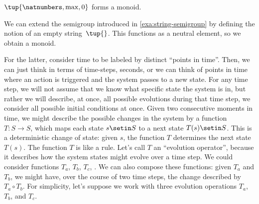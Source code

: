 \begin{example}
    $\tup{\natnumbers, \max,0}$ forms a monoid.
\end{example}

\begin{example}
    \label{exa:string-monoid}
    We can extend the semigroup introduced in \cref{exa:string-semigroup} by defining the notion of an empty string~$\tup{}$.
    This functions as a neutral element, so we obtain a monoid.
\end{example}

%
%
For the latter, consider time to be labeled by distinct ``points in time''.
Then, we can just think in terms of time-steps, \eg  seconds, or we can think of points in time where \eg  an action is triggered and the system passes to a new state.
%
For any time step, we will not assume that we know what specific state the system is in, but rather we will describe, at once, all possible evolutions during that time step, \ie  we consider all possible initial conditions at once.
Given two consecutive moments in time, we might describe the possible changes in the system by a function $T : S \rightarrow S$, which maps each state $s \setin S$ to a next state $T(s) \setin S$.
This is a deterministic change of state: given $s$, the function $T$ determines the next state $T(s)$.
The function $T$ is like a rule.
Let's call $T$ an ``evolution operator'', because it describes how the system states might evolve over a time step.
%
We could consider functions $T_a$, $T_b$, $T_c$, \etc.
We can also compose these functions: given $T_a$ and $T_b$, we might have, over the course of two time steps, the change described by $T_a \circ T_b$.
For simplicity, let's suppose we work with three evolution operations $T_a$, $T_b$, and $T_c$.
%
%
%
%
%
